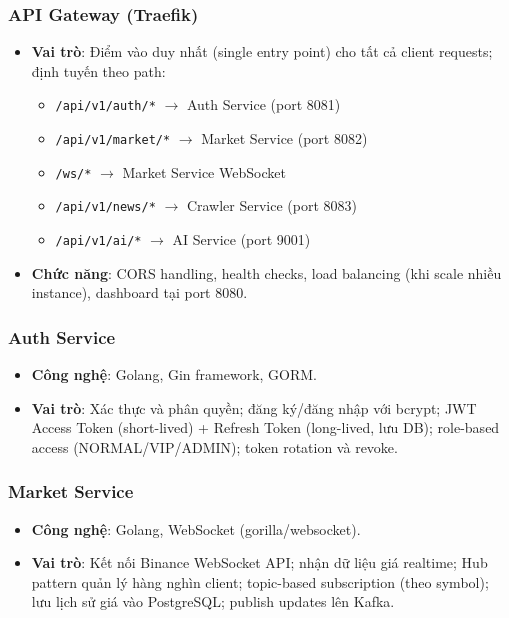 \subsubsection{API Gateway (Traefik)}

\begin{itemize}
    \item \textbf{Vai trò}: Điểm vào duy nhất (single entry point) cho tất cả client requests; định tuyến theo path:
    \begin{itemize}
        \item \texttt{/api/v1/auth/*} $\to$ Auth Service (port 8081)
        \item \texttt{/api/v1/market/*} $\to$ Market Service (port 8082)
        \item \texttt{/ws/*} $\to$ Market Service WebSocket
        \item \texttt{/api/v1/news/*} $\to$ Crawler Service (port 8083)
        \item \texttt{/api/v1/ai/*} $\to$ AI Service (port 9001)
    \end{itemize}
    \item \textbf{Chức năng}: CORS handling, health checks, load balancing (khi scale nhiều instance), dashboard tại port 8080.
\end{itemize}

\subsubsection{Auth Service}

\begin{itemize}
    \item \textbf{Công nghệ}: Golang, Gin framework, GORM.
    \item \textbf{Vai trò}: Xác thực và phân quyền; đăng ký/đăng nhập với bcrypt; JWT Access Token (short-lived) + Refresh Token (long-lived, lưu DB); role-based access (NORMAL/VIP/ADMIN); token rotation và revoke.
\end{itemize}

\subsubsection{Market Service}

\begin{itemize}
    \item \textbf{Công nghệ}: Golang, WebSocket (gorilla/websocket).
    \item \textbf{Vai trò}: Kết nối Binance WebSocket API; nhận dữ liệu giá realtime; Hub pattern quản lý hàng nghìn client; topic-based subscription (theo symbol); lưu lịch sử giá vào PostgreSQL; publish updates lên Kafka.
\end{itemize}

